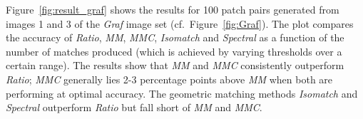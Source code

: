 Figure~\ref{fig:result_graf} shows the results for 100 patch pairs 
generated from images 1 and 3 of the \emph{Graf} image set 
(cf.~Figure~\ref{fig:Graf}). The plot compares the accuracy of 
\emph{Ratio}, \emph{MM}, \emph{MMC}, \emph{Isomatch} and \emph{Spectral} 
as a function of the number of matches produced (which is achieved by 
varying thresholds over a certain range). The results show that 
\emph{MM} and \emph{MMC} consistently outperform \emph{Ratio}; 
\emph{MMC} generally lies 2-3 percentage points above \emph{MM} when 
both are performing at optimal accuracy.  The geometric matching methods 
\emph{Isomatch} and \emph{Spectral} outperform \emph{Ratio} but fall 
short of \emph{MM} and \emph{MMC}.


\begin{figure}[htb]
\end{figure}
